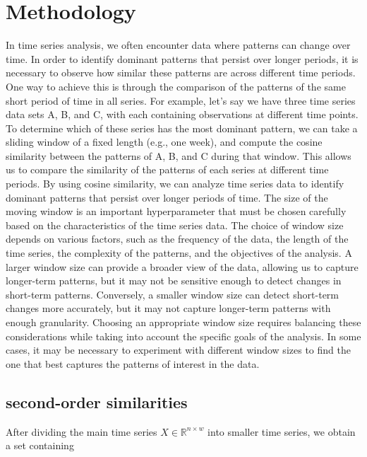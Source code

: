 \documentclass[twoside,11pt]{article}
\begin{document}
\section{Methodology}
In time series analysis, we often encounter data where patterns can change over time. In
order to identify dominant patterns that persist over longer periods, it is necessary to
observe how similar these patterns are across different time periods. One way to achieve
this is through the comparison of the patterns of the same short period of time in all series.
For example, let’s say we have three time series data sets A, B, and C, with each
containing observations at different time points. To determine which of these series has the
most dominant pattern, we can take a sliding window of a fixed length (e.g., one week),
and compute the cosine similarity between the patterns of A, B, and C during that window.
This allows us to compare the similarity of the patterns of each series at different time
periods. By using cosine similarity, we can analyze time series data to identify dominant
patterns that persist over longer periods of time.
The size of the moving window is an important hyperparameter that must be chosen
carefully based on the characteristics of the time series data. The choice of window size
depends on various factors, such as the frequency of the data, the length of the time series,
the complexity of the patterns, and the objectives of the analysis. A larger window size
can provide a broader view of the data, allowing us to capture longer-term patterns, but
it may not be sensitive enough to detect changes in short-term patterns. Conversely, a
smaller window size can detect short-term changes more accurately, but it may not capture
longer-term patterns with enough granularity. Choosing an appropriate window size requires
balancing these considerations while taking into account the specific goals of the analysis.
In some cases, it may be necessary to experiment with different window sizes to find the
one that best captures the patterns of interest in the data.

\subsection{second-order similarities}

After dividing the main time series \( X \in \mathbb{R}^{n \times w} \) into smaller time series, we obtain a set containing  
\end{document}
